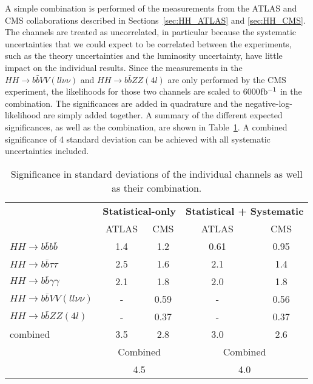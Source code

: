 A simple combination is performed of the measurements from the ATLAS and CMS collaborations described in Sections~\ref{sec:HH_ATLAS} and \ref{sec:HH_CMS}.
The channels are treated as uncorrelated, in particular because the systematic uncertainties that we could expect to be correlated between the experiments, such as the theory uncertainties and the luminosity uncertainty, have little impact on the individual results. Since the measurements in the $HH \rightarrow b\bar{b}VV(ll\nu\nu)$ and $HH \rightarrow b\bar{b}ZZ(4l)$ are only performed by the CMS experiment, the likelihoods for those two channels are scaled to 6000$\mbox{fb$^{-1}$}$ in the combination.
The significances are added in quadrature and the negative-log-likelihood are simply added together. A summary of the different expected significances, as well as the combination, are shown in Table~\ref{tab:comb_significance}. A combined significance of 4 standard deviation can be achieved with all systematic uncertainties included.

\begin{table}[htb!]
\begin{center}
\begin{tabular}{lcccc} \toprule
 & \multicolumn{2}{c}{\textbf{Statistical-only}} & \multicolumn{2}{c}{\textbf{Statistical + Systematic}}\\
 & ATLAS & CMS & ATLAS & CMS \\
\hline
$HH \rightarrow b\bar{b}b\bar{b}$ & 1.4 & 1.2 & 0.61 & 0.95 \\
$HH \rightarrow b\bar{b}\tau\tau$ & 2.5 & 1.6 & 2.1 & 1.4 \\
$HH \rightarrow b\bar{b}\gamma\gamma$ & 2.1 & 1.8 & 2.0 & 1.8 \\
$HH \rightarrow b\bar{b}VV(ll\nu\nu)$ & - & 0.59 & - & 0.56 \\
$HH \rightarrow b\bar{b}ZZ(4l)$ & - & 0.37 & - & 0.37 \\
combined &  3.5 & 2.8 & 3.0 & 2.6 \\
\hline
 &  \multicolumn{2}{c}{Combined} & \multicolumn{2}{c}{Combined}\\
 &  \multicolumn{2}{c}{4.5} & \multicolumn{2}{c}{4.0}\\
\bottomrule
\end{tabular}
\end{center}
\caption{Significance in standard deviations of the individual channels as well as their combination.}
\label{tab:comb_significance}
\end{table}

